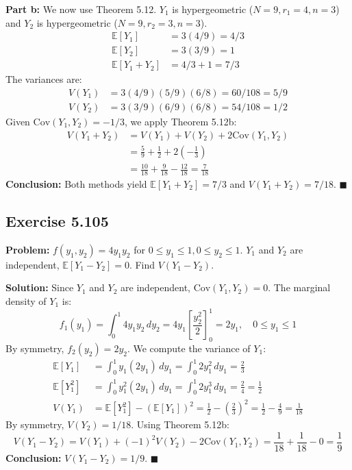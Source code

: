 \documentclass[11pt, a4paper]{article}
\theoremstyle{definition}
\theoremstyle{remark}
\newcommand{\E}{\mathbb{E}}
\begin{document}
\textbf{Part b:} We now use Theorem 5.12. $Y_1$ is hypergeometric ($N=9, r_1=4, n=3$) and $Y_2$ is hypergeometric ($N=9, r_2=3, n=3$).
\begin{align*}
\E[Y_1] &= 3(4/9) = 4/3 \\
\E[Y_2] &= 3(3/9) = 1 \\
\E[Y_1+Y_2] &= 4/3 + 1 = 7/3
\end{align*}
The variances are:
\begin{align*}
V(Y_1) &= 3(4/9)(5/9)(6/8) = 60/108 = 5/9 \\
V(Y_2) &= 3(3/9)(6/9)(6/8) = 54/108 = 1/2
\end{align*}
Given $\text{Cov}(Y_1, Y_2) = -1/3$, we apply Theorem 5.12b:
\begin{align*}
V(Y_1 + Y_2) &= V(Y_1) + V(Y_2) + 2\text{Cov}(Y_1, Y_2) \\
&= \frac{5}{9} + \frac{1}{2} + 2\left(-\frac{1}{3}\right) \\
&= \frac{10}{18} + \frac{9}{18} - \frac{12}{18} = \frac{7}{18}
\end{align*}
\textbf{Conclusion:} Both methods yield $\E[Y_1+Y_2] = 7/3$ and $V(Y_1+Y_2) = 7/18$. $\blacksquare$

\subsection{Exercise 5.105}
\textbf{Problem:} $f(y_1, y_2) = 4y_1 y_2$ for $0 \le y_1 \le 1, 0 \le y_2 \le 1$. $Y_1$ and $Y_2$ are independent, $\E[Y_1 - Y_2] = 0$. Find $V(Y_1 - Y_2)$.

\textbf{Solution:}
Since $Y_1$ and $Y_2$ are independent, $\text{Cov}(Y_1, Y_2) = 0$.
The marginal density of $Y_1$ is:
\[ f_1(y_1) = \int_0^1 4y_1 y_2 \, dy_2 = 4y_1 \left[ \frac{y_2^2}{2} \right]_0^1 = 2y_1, \quad 0 \le y_1 \le 1 \]
By symmetry, $f_2(y_2) = 2y_2$.
We compute the variance of $Y_1$:
\begin{align*}
\E[Y_1] &= \int_0^1 y_1 (2y_1) \, dy_1 = \int_0^1 2y_1^2 \, dy_1 = \frac{2}{3} \\
\E[Y_1^2] &= \int_0^1 y_1^2 (2y_1) \, dy_1 = \int_0^1 2y_1^3 \, dy_1 = \frac{2}{4} = \frac{1}{2} \\
V(Y_1) &= \E[Y_1^2] - (\E[Y_1])^2 = \frac{1}{2} - \left(\frac{2}{3}\right)^2 = \frac{1}{2} - \frac{4}{9} = \frac{1}{18}
\end{align*}
By symmetry, $V(Y_2) = 1/18$.
Using Theorem 5.12b:
\[ V(Y_1 - Y_2) = V(Y_1) + (-1)^2 V(Y_2) - 2\text{Cov}(Y_1, Y_2) = \frac{1}{18} + \frac{1}{18} - 0 = \frac{1}{9} \]
\textbf{Conclusion:} $V(Y_1 - Y_2) = 1/9$. $\blacksquare$
\end{document}
